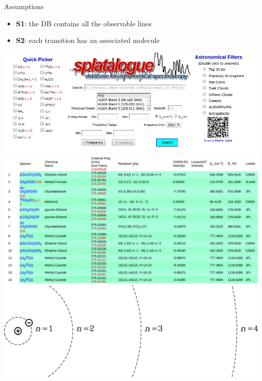 \documentclass[slidestop,compress,mathserif,color,12pt]{beamer}
\begin{document}
\begin{frame}
\begin{minipage}{0.65\linewidth}
\begin{center}
\begin{minipage}{0.90\linewidth}
\begin{block}{Assumptions}
\begin{itemize}
\item \textbf{S1}: the DB contains all the observable lines
\item \textbf{S2}: each transition has an associated molecule
\end{itemize}
\end{block}
\end{minipage}
\end{center}
\end{minipage}
\hfill
\begin{minipage}{0.29\linewidth}
\includegraphics[width=0.99\linewidth]{splata.jpg}\\
\vskip1cm
\includegraphics[width=0.99\linewidth]{molecules.png}\\
\vskip1cm
\includegraphics[width=0.99\linewidth]{recom.png}\\
\end{minipage}
\end{frame}
\end{document}
